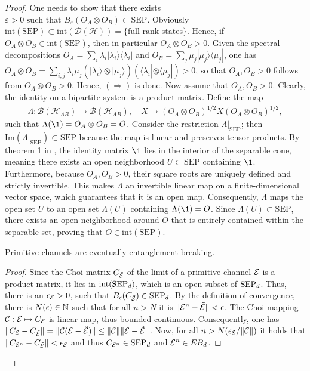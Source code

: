 \begin{proof}
One needs to show that there exists $\varepsilon > 0 \text{ such that } B_\varepsilon(O_A \otimes O_B) \subset \text{SEP}$. Obviously $\text{int}(\text{SEP}) \subset \text{int}(\mathcal{D}(\mathcal{H})) = \{ \text{full rank states} \}$. Hence, if $O_A \otimes O_B \in \text{int}(\text{SEP})$, then in particular $
    O_A \otimes O_B > 0$. Given the spectral decompositions $O_A = \sum_i \lambda_i |\lambda_i\rangle\langle\lambda_i|$ and $O_B = \sum_j \mu_j |\mu_j\rangle\langle\mu_j|$, one has 
$O_A \otimes O_B = \sum_{i,j} \lambda_i \mu_j (|\lambda_i\rangle \otimes |\mu_j\rangle)(\langle\lambda_i| \otimes \langle\mu_j|) > 0$, so that $O_A,O_B > 0$ follows from $O_A \otimes O_B > 0$. Hence, $(\Rightarrow)$ is done. Now assume that $O_A, O_B > 0$. Clearly, the identity on a bipartite system is a product matrix. Define the map
\begin{align*}
    \Lambda : \mathcal{B}(\mathcal{H}_{AB}) \to \mathcal{B}(\mathcal{H}_{AB}), \quad X \mapsto (O_A \otimes O_B)^{1/2} X (O_A \otimes O_B)^{1/2},
\end{align*}
such that $\Lambda(\1) = O_A \otimes O_B = O$. Consider the restriction $\Lambda|_{\text{SEP}}$; then $\text{Im}(\Lambda|_{\text{SEP}}) \subset \text{SEP}$ because the map is linear and preserves tensor products. By theorem 1 in \cite{gurvitsLargestSeparableBalls2002}, the identity matrix $\1$ lies in the interior of the separable cone, meaning there exists an open neighborhood $U \subset \text{SEP}$ containing $\1$. Furthermore, because $O_A, O_B > 0$, their square roots are uniquely defined and strictly invertible. This makes $\Lambda$ an invertible linear map on a finite-dimensional vector space, which guarantees that it is an open map. Consequently, $\Lambda$ maps the open set $U$ to an open set $\Lambda(U)$ containing $\Lambda(\1) = O$. Since $\Lambda(U) \subset \text{SEP}$, there exists an open neighborhood around $O$ that is entirely contained within the separable set, proving that $O \in \text{int}(\text{SEP})$.

\begin{prop}
    Primitive channels are eventually entanglement-breaking. \label{prop:primitive-eeb}
\end{prop}
\begin{proof}
    Since the Choi matrix $C_{\tilde{\mathcal E}}$ of the limit of a primitive channel $\mathcal E$ is a product matrix, it lies in $\mathrm{int}(\mathrm{SEP}_d)$, which is an open subset of $\mathrm{SEP}_d$. Thus, there is an $\epsilon_{\mathcal E} > 0$, such that $B_{\epsilon} (C_{\tilde {\mathcal E}})\in \mathrm{SEP}_d$. By the definition of convergence, there is $N(\epsilon) \in \mathbb{N}$ such that for all $n> N$ it is $\lVert\mathcal E^n- \tilde{\mathcal E}\rVert< \epsilon$. The Choi mapping $\mathcal C: \mathcal E \mapsto C_{\mathcal E}$ is linear map, thus bounded continuous. Consequently, one has  $\lVert C_{\mathcal E}-C_{\tilde{\mathcal E}}\rVert = \lVert\mathcal C({\mathcal E}-{\tilde{\mathcal E}})\rVert \leq \lVert\mathcal C\rVert \lVert{\mathcal E}-{\tilde{\mathcal E}}\rVert$. Now, for all $n> N(\epsilon_{\mathcal E}/\lVert\mathcal C\rVert)$ it holds that $\lVert C_{\mathcal E^n}-C_{\tilde{\mathcal E}}\rVert < \epsilon_{\mathcal E}$ and thus $C_{\mathcal E^n} \in \mathrm{SEP}_d$ and $\mathcal E^n \in EB_d$.
\end{proof}


\end{proof}
